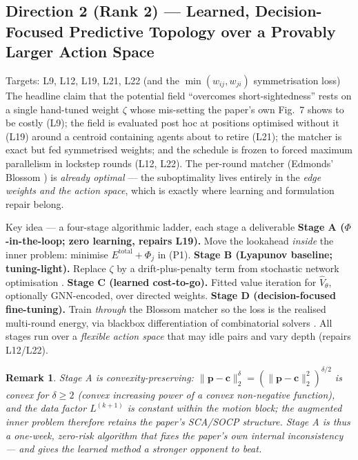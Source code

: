 \documentclass[11pt,a4paper]{article}
\newtheorem{remark}{Remark}
\begin{document}
\subsection{Direction 2 (Rank 2) --- Learned, Decision-Focused Predictive Topology over a Provably Larger Action Space}
\label{sec:d2}

\begin{limitbox}{Targets: L9, L12, L19, L21, L22 (and the $\min(w_{ij},w_{ji})$ symmetrisation loss)}
The headline claim that the potential field ``overcomes short-sightedness'' rests on a single hand-tuned weight $\zeta$ whose mis-setting the paper's own Fig.~7 shows to be costly (L9); the field is evaluated post hoc at positions optimised without it (L19) around a centroid containing agents about to retire (L21); the matcher is exact but fed symmetrised weights; and the schedule is frozen to forced maximum parallelism in lockstep rounds (L12, L22). The per-round matcher (Edmonds' Blossom \cite{edmonds}) is \emph{already optimal} --- the suboptimality lives entirely in the \emph{edge weights and the action space}, which is exactly where learning and formulation repair belong.
\end{limitbox}

\begin{ideabox}{Key idea --- a four-stage algorithmic ladder, each stage a deliverable}
\textbf{Stage A ($\Phi$-in-the-loop; zero learning, repairs L19).} Move the lookahead \emph{inside} the inner problem: minimise $E^{\mathrm{total}}+\Phi_j$ in (P1). \textbf{Stage B (Lyapunov baseline; tuning-light).} Replace $\zeta$ by a drift-plus-penalty term from stochastic network optimisation \cite{neely}. \textbf{Stage C (learned cost-to-go).} Fitted value iteration for $\hat V_\theta$, optionally GNN-encoded, over directed weights. \textbf{Stage D (decision-focused fine-tuning).} Train \emph{through} the Blossom matcher so the loss is the realised multi-round energy, via blackbox differentiation of combinatorial solvers \cite{vlastelica,berthet}. All stages run over a \emph{flexible action space} that may idle pairs and vary depth (repairs L12/L22).
\end{ideabox}

\begin{remark}\label{rem:phiconvex}
Stage A is convexity-preserving: $\lVert\mathbf p-\mathbf c\rVert_2^{\delta}=(\lVert\mathbf p-\mathbf c\rVert_2^{2})^{\delta/2}$ is convex for $\delta\ge 2$ (convex increasing power of a convex non-negative function), and the data factor $L^{(k+1)}$ is constant within the motion block; the augmented inner problem therefore retains the paper's SCA/SOCP structure. Stage A is thus a one-week, zero-risk algorithm that fixes the paper's own internal inconsistency --- and gives the learned method a \emph{stronger} opponent to beat.
\end{remark}
\end{document}
